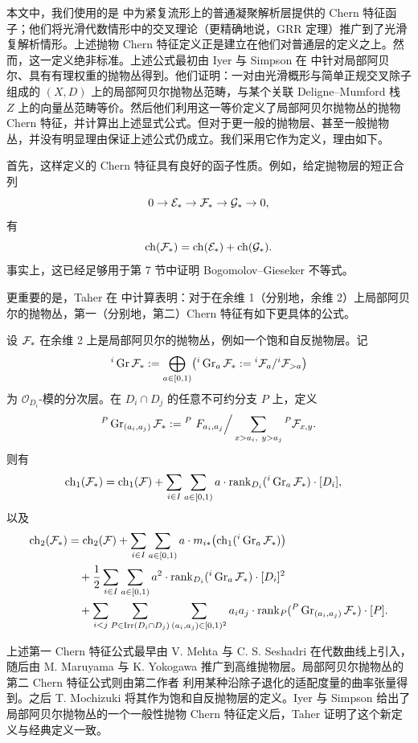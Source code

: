 \begin{remark}
本文中，我们使用的是 \cite{Kf} 中为紧复流形上的普通凝聚解析层提供的 Chern 特征函子；他们将光滑代数情形中的交叉理论（更精确地说，GRR 定理）推广到了光滑复解析情形。上述抛物 Chern 特征定义正是建立在他们对普通层的定义之上。然而，这一定义绝非标准。上述公式最初由 Iyer 与 Simpson 在 \cite{Iy-Si} 中针对局部阿贝尔、具有有理权重的抛物丛得到。他们证明：一对由光滑概形与简单正规交叉除子组成的 \((X,D)\) 上的局部阿贝尔抛物丛范畴，与某个关联 Deligne--Mumford 栈 \(Z\) 上的向量丛范畴等价。然后他们利用这一等价定义了局部阿贝尔抛物丛的抛物 Chern 特征，并计算出上述显式公式。但对于更一般的抛物层、甚至一般抛物丛，并没有明显理由保证上述公式仍成立。我们采用它作为定义，理由如下。

首先，这样定义的 Chern 特征具有良好的函子性质。例如，给定抛物层的短正合列
\[
0\to \mathcal{E}_*\to \mathcal{F}_*\to \mathcal{G}_*\to 0,
\]
有
\[
\operatorname{ch}(\mathcal{F}_*)=\operatorname{ch}(\mathcal{E}_*)+\operatorname{ch}(\mathcal{G}_*).
\]
事实上，这已经足够用于第 7 节中证明 Bogomolov--Gieseker 不等式。

更重要的是，Taher 在 \cite{Ta} 中计算表明：对于在余维 1（分别地，余维 2）上局部阿贝尔的抛物丛，第一（分别地，第二）Chern 特征有如下更具体的公式。
\end{remark}

设 \(\mathcal{F}_*\) 在余维 2 上是局部阿贝尔的抛物丛，例如一个饱和自反抛物层。记
\[
{}^i\operatorname{Gr} \mathcal{F}_*:=\bigoplus_{a\in[0,1)}\bigl({}^i\operatorname{Gr}_a\mathcal{F}_*:={}^i\mathcal{F}_a/{}^i\mathcal{F}_{>a}\bigr)
\]
为 \(\mathcal O_{D_i}\)-模的分次层。在 \(D_i\cap D_j\) 的任意不可约分支 \(P\) 上，定义
\[
{}^P\operatorname{Gr}_{(a_i,a_j)}\mathcal{F}_*:=
{}^P\ F_{a_i,a_j}\Big/\sum_{x>a_i,\ y>a_j} {}^P \mathcal{F}_{x,y}.
\]
则有
\begin{align}
\operatorname{ch}_1(\mathcal{F}_*)
&=
\operatorname{ch}_1(\mathcal{F})+
\sum_{i\in I}\sum_{a\in[0,1)}
a\cdot \operatorname{rank}_{D_i}({}^i\operatorname{Gr}_a\mathcal{F}_*)\cdot [D_i],
\end{align}
以及
\begin{align}
\operatorname{ch}_2(\mathcal{F}_*)
&=
\operatorname{ch}_2(\mathcal{F})
+\sum_{i\in I}\sum_{a\in[0,1)}
a\cdot m_{i*}\bigl(\operatorname{ch}_1({}^i\operatorname{Gr}_a\mathcal{F}_*)\bigr)\\
&\quad
+\frac12\sum_{i\in I}\sum_{a\in[0,1)}
a^2\cdot \operatorname{rank}_{D_i}({}^i\operatorname{Gr}_a\mathcal{F}_*)\cdot [D_i]^2
\nonumber\\
&\quad
+\sum_{i<j}\sum_{P\in \operatorname{Irr}(D_i\cap D_j)}
\sum_{(a_i,a_j)\in[0,1)^2}
a_i a_j \cdot \operatorname{rank}_P({}^P\operatorname{Gr}_{(a_i,a_j)}\mathcal{F}_*)\cdot [P].
\end{align}

\begin{remark}
上述第一 Chern 特征公式最早由 V. Mehta 与 C. S. Seshadri \cite{Me-Se} 在代数曲线上引入，随后由 M. Maruyama 与 K. Yokogawa \cite{Ma-Yo} 推广到高维抛物层。局部阿贝尔抛物丛的第二 Chern 特征公式则由第二作者 \cite[Lemma 7.3, 7.4]{Li} 利用某种沿除子退化的适配度量的曲率张量得到。之后 T. Mochizuki \cite{Mo3} 将其作为饱和自反抛物层的定义。Iyer 与 Simpson \cite{Iy-Si} 给出了局部阿贝尔抛物丛的一个一般性抛物 Chern 特征定义后，Taher \cite{Ta} 证明了这个新定义与经典定义一致。
\end{remark}

